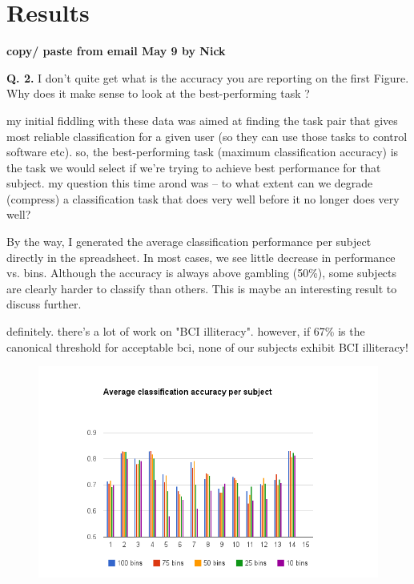\section{Results}
{\bf copy/ paste from email May 9 by Nick}

{\bf Q. 2.}  I don't quite get what is the accuracy you are reporting on the first Figure. Why does it make sense to look at the best-performing task ? 

my initial fiddling with these data was aimed at finding the task pair that gives most reliable classification for a given user (so they can use those tasks to control software etc). so, the best-performing task (maximum classification accuracy) is the task we would select if we're trying to achieve best performance for that subject. my question this time arond was -- to what extent can we degrade (compress) a classification task that does very well before it no longer does very well?

    By the way, I generated the average classification performance per subject directly in the spreadsheet. In most cases, we see little decrease in performance vs. bins. Although the accuracy is always above gambling (50\%), some subjects are clearly harder to classify than others. This is maybe an interesting result to discuss further.


definitely. there's a lot of work on "BCI illiteracy". however, if 67\% is the canonical threshold for acceptable bci, none of our subjects exhibit BCI illiteracy!
 
\begin{figure}
\begin{center}
\includegraphics[width=6in]{Figures/avg_classification_accuracy_per_subject.png}
\caption{ }
\label{ }
\end{center}
\end{figure}



